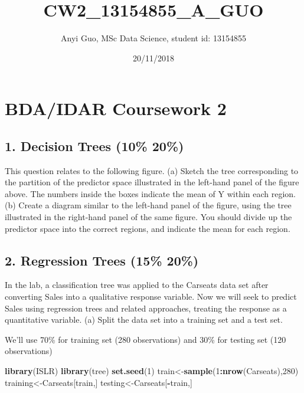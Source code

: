 \documentclass[]{article}
\title{CW2\_13154855\_A\_GUO}
\author{Anyi Guo, MSc Data Science, student id: 13154855}
\date{20/11/2018}
\newenvironment{Shaded}{\begin{snugshade}}{\end{snugshade}}
\newcommand{\KeywordTok}[1]{\textcolor[rgb]{0.13,0.29,0.53}{\textbf{#1}}}
\newcommand{\DecValTok}[1]{\textcolor[rgb]{0.00,0.00,0.81}{#1}}
\newcommand{\OperatorTok}[1]{\textcolor[rgb]{0.81,0.36,0.00}{\textbf{#1}}}
\newcommand{\NormalTok}[1]{#1}
\begin{document}
\maketitle

\section{BDA/IDAR Coursework 2}\label{bdaidar-coursework-2}

\subsection{1. Decision Trees (10\% \textbar{}
20\%)}\label{decision-trees-10-20}

This question relates to the following figure. (a) Sketch the tree
corresponding to the partition of the predictor space illustrated in the
left-hand panel of the figure above. The numbers inside the boxes
indicate the mean of Y within each region. (b) Create a diagram similar
to the left-hand panel of the figure, using the tree illustrated in the
right-hand panel of the same figure. You should divide up the predictor
space into the correct regions, and indicate the mean for each region.

\subsection{2. Regression Trees (15\% \textbar{}
20\%)}\label{regression-trees-15-20}

In the lab, a classification tree was applied to the Carseats data set
after converting Sales into a qualitative response variable. Now we will
seek to predict Sales using regression trees and related approaches,
treating the response as a quantitative variable. (a) Split the data set
into a training set and a test set.

We'll use 70\% for training set (280 observations) and 30\% for testing
set (120 observations)

\begin{Shaded}
\begin{Highlighting}[]
\KeywordTok{library}\NormalTok{(ISLR)}
\KeywordTok{library}\NormalTok{(tree)}
\KeywordTok{set.seed}\NormalTok{(}\DecValTok{1}\NormalTok{)}
\NormalTok{train<-}\KeywordTok{sample}\NormalTok{(}\DecValTok{1}\OperatorTok{:}\KeywordTok{nrow}\NormalTok{(Carseats),}\DecValTok{280}\NormalTok{)}
\NormalTok{training<-Carseats[train,]}
\NormalTok{testing<-Carseats[}\OperatorTok{-}\NormalTok{train,]}
\end{Highlighting}
\end{Shaded}
\end{document}

